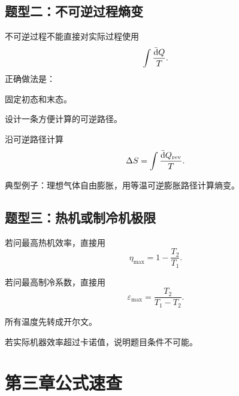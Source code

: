 \subsection{题型二：不可逆过程熵变}

\begin{MethodBox}[不可逆过程熵变计算]
不可逆过程不能直接对实际过程使用
\[
  \int\frac{\mathop{}\!\bar{\mathrm{d}} Q}{T}.
\]
正确做法是：
\begin{ReviewList}
  \item 固定初态和末态。
  \item 设计一条方便计算的可逆路径。
  \item 沿可逆路径计算
  \[
    \Delta S=\int\frac{\mathop{}\!\bar{\mathrm{d}} Q_{\mathrm{rev}}}{T}.
  \]
\end{ReviewList}
典型例子：理想气体自由膨胀，用等温可逆膨胀路径计算熵变。
\end{MethodBox}

\subsection{题型三：热机或制冷机极限}

\begin{MethodBox}[卡诺类题目]
\begin{ReviewList}
  \item 若问最高热机效率，直接用
  \[
    \eta_{\max}=1-\frac{T_2}{T_1}.
  \]
  \item 若问最高制冷系数，直接用
  \[
    \varepsilon_{\max}=\frac{T_2}{T_1-T_2}.
  \]
  \item 所有温度先转成开尔文。
  \item 若实际机器效率超过卡诺值，说明题目条件不可能。
\end{ReviewList}
\end{MethodBox}

\section{第三章公式速查}

